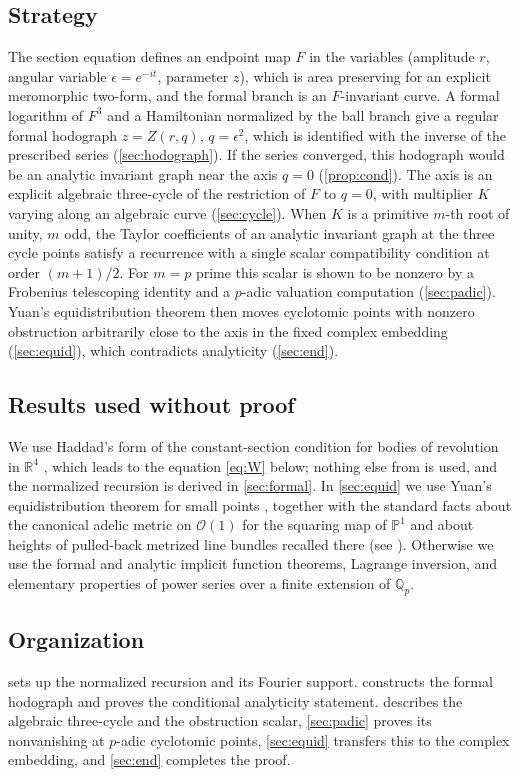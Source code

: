 \documentclass[11pt]{amsart}
\numberwithin{equation}{section}
\theoremstyle{definition}
\theoremstyle{remark}
\newcommand{\R}{\mathbb{R}}
\newcommand{\Q}{\mathbb{Q}}
\begin{document}
\subsection*{Strategy}
The section equation defines an endpoint map $F$ in the variables (amplitude $r$, angular variable $\epsilon=e^{-it}$, parameter $z$), which is area preserving for an explicit meromorphic two-form, and the formal branch is an $F$-invariant curve. A formal logarithm of $F^3$ and a Hamiltonian normalized by the ball branch give a regular formal hodograph $z=Z(r,q)$, $q=\epsilon^2$, which is identified with the inverse of the prescribed series (\cref{sec:hodograph}). If the series converged, this hodograph would be an analytic invariant graph near the axis $q=0$ (\cref{prop:cond}). The axis is an explicit algebraic three-cycle of the restriction of $F$ to $q=0$, with multiplier $K$ varying along an algebraic curve (\cref{sec:cycle}). When $K$ is a primitive $m$-th root of unity, $m$ odd, the Taylor coefficients of an analytic invariant graph at the three cycle points satisfy a recurrence with a single scalar compatibility condition at order $(m+1)/2$. For $m=p$ prime this scalar is shown to be nonzero by a Frobenius telescoping identity and a $p$-adic valuation computation (\cref{sec:padic}). Yuan's equidistribution theorem then moves cyclotomic points with nonzero obstruction arbitrarily close to the axis in the fixed complex embedding (\cref{sec:equid}), which contradicts analyticity (\cref{sec:end}).

\subsection*{Results used without proof}
We use Haddad's form of the constant-section condition for bodies of revolution in $\R^4$ \cite[equation (6) and Section 2]{Had}, which leads to the equation \eqref{eq:W} below; nothing else from \cite{Had} is used, and the normalized recursion is derived in \cref{sec:formal}. In \cref{sec:equid} we use Yuan's equidistribution theorem for small points \cite[Theorem 3.1]{Yuan}, together with the standard facts about the canonical adelic metric on $\mathcal O(1)$ for the squaring map of $\mathbb P^1$ and about heights of pulled-back metrized line bundles recalled there (see \cite[Sections 1.1 and 3.5]{Yuan}). Otherwise we use the formal and analytic implicit function theorems, Lagrange inversion, and elementary properties of power series over a finite extension of $\Q_p$.

\subsection*{Organization}
 sets up the normalized recursion and its Fourier support.  constructs the formal hodograph and proves the conditional analyticity statement.  describes the algebraic three-cycle and the obstruction scalar, \cref{sec:padic} proves its nonvanishing at $p$-adic cyclotomic points, \cref{sec:equid} transfers this to the complex embedding, and \cref{sec:end} completes the proof.
\end{document}
